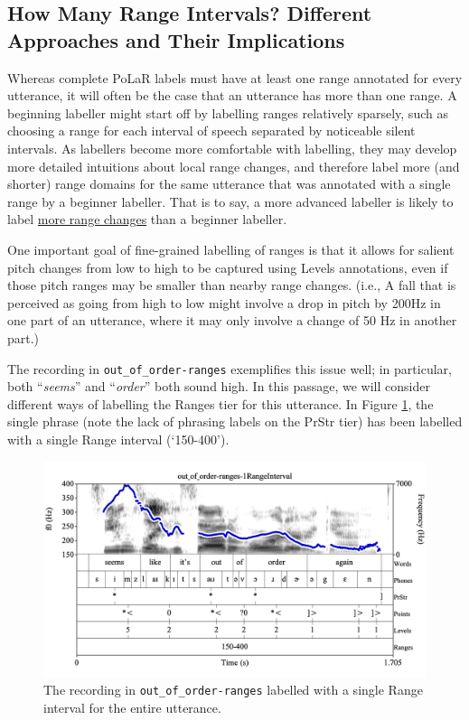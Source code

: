 \documentclass[11pt, twoside]{memoir}
\def\langtext#1{\textit{#1}}
\begin{document}
\subsection{How Many Range Intervals? Different Approaches and Their Implications}\label{sec:how-many-range-intervals-different-approaches-and-their-implications}

Whereas complete PoLaR labels must have at least one range annotated for every utterance, it will often be the case that an utterance has more than one range. A beginning labeller might start off by labelling ranges relatively sparsely, such as choosing a range for each interval of speech separated by noticeable silent intervals. As labellers become more comfortable with labelling, they may develop more detailed intuitions about local range changes, and therefore label more (and shorter) range domains for the same utterance that was annotated with a single range by a beginner labeller. That is to say, a more advanced labeller is likely to label \uline{more range changes} than a beginner labeller.

One important goal of fine-grained labelling of ranges is that it allows for salient pitch changes from low to high to be captured using Levels annotations, even if those pitch ranges may be smaller than nearby range changes. (i.e., A fall that is perceived as going from high to low might involve a drop in pitch by 200Hz in one part of an utterance, where it may only involve a change of 50 Hz in another part.)

The recording in \texttt{out\_of\_order-ranges} exemplifies this issue well; in particular, both “\langtext{seems}” and “\langtext{order}” both sound high.  In this passage, we will consider different ways of labelling the Ranges tier for this utterance. In Figure \ref{fig:out_of_order-ranges 1range Ranges Adv}, the single phrase (note the lack of phrasing labels on the PrStr tier) has been labelled with a single Range interval (‘150-400’).

\begin{figure}[H]
\centering
%
\includegraphics[width=.875\linewidth]{Ranges-out_of_order-ranges-1RangeInterval.png}
%
\caption[A single Range interval for the entire utterance.]{The recording in \texttt{out\_of\_order-ranges} labelled with a single Range interval for the entire utterance.%
\label{fig:out_of_order-ranges 1range Ranges Adv}%
}
\end{figure}
\end{document}
